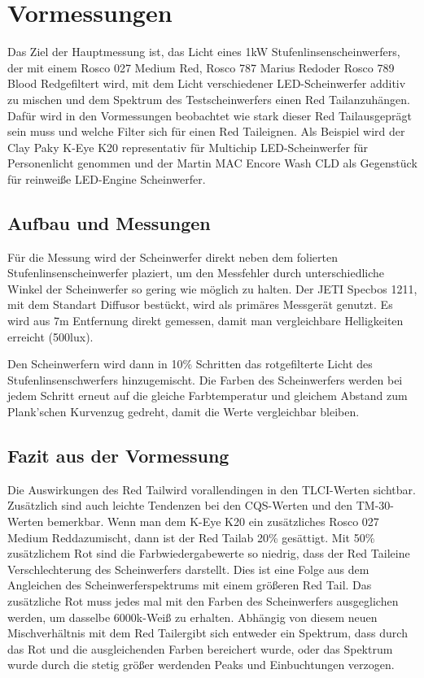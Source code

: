 \chapter{Vormessungen}

Das Ziel der Hauptmessung ist, das Licht eines 1kW Stufenlinsenscheinwerfers, der mit einem Rosco 027 \glqq Medium Red\grqq , Rosco 787 \glqq Marius Red\grqq oder Rosco 789 \glqq Blood Red\grqq gefiltert wird, mit dem Licht verschiedener LED-Scheinwerfer additiv zu mischen und dem Spektrum des Testscheinwerfers einen \glqq Red Tail\grqq anzuhängen. 
Dafür wird in den Vormessungen beobachtet wie stark dieser \glqq Red Tail\grqq ausgeprägt sein muss und welche Filter sich für einen \glqq Red Tail\grqq eignen.   
Als Beispiel wird der Clay Paky K-Eye K20 representativ für Multichip LED-Scheinwerfer für Personenlicht genommen und der Martin MAC Encore Wash CLD als Gegenstück für reinweiße LED-Engine Scheinwerfer. 

\section{Aufbau und Messungen}
\label{sec_vmaum}

Für die Messung wird der Scheinwerfer direkt neben dem folierten Stufenlinsenscheinwerfer plaziert, um den Messfehler durch unterschiedliche Winkel der Scheinwerfer so gering wie möglich zu halten. Der JETI Specbos 1211, mit dem Standart Diffusor bestückt, wird als primäres Messgerät genutzt. Es wird aus 7m Entfernung direkt gemessen, damit man vergleichbare Helligkeiten erreicht (500lux). 

Den Scheinwerfern wird dann in 10\% Schritten das rotgefilterte Licht des Stufenlinsenschwerfers hinzugemischt. Die Farben des Scheinwerfers werden bei jedem Schritt erneut auf die gleiche Farbtemperatur und gleichem Abstand zum Plank'schen Kurvenzug gedreht, damit die Werte vergleichbar bleiben.


\section{Fazit aus der Vormessung}
\label{sec_vmfazit}
Die Auswirkungen des \glqq Red Tail\grqq wird vorallendingen in den TLCI-Werten sichtbar. Zusätzlich sind auch leichte Tendenzen bei den CQS-Werten und den TM-30-Werten bemerkbar.
Wenn man dem K-Eye K20 ein zusätzliches Rosco 027 \glqq Medium Red\grqq dazumischt, dann ist der \glqq Red Tail\grqq ab 20\% gesättigt. Mit 50\% zusätzlichem Rot sind die Farbwiedergabewerte so niedrig, dass der \glqq Red Tail\grqq eine Verschlechterung des Scheinwerfers darstellt. Dies ist eine Folge aus dem Angleichen des Scheinwerferspektrums mit einem größeren \glqq Red Tail\grqq.
Das zusätzliche Rot muss jedes mal mit den Farben des Scheinwerfers ausgeglichen werden, um dasselbe 6000k-Weiß zu erhalten. Abhängig von diesem neuen Mischverhältnis mit dem \glqq Red Tail\grqq ergibt sich entweder ein Spektrum, dass durch das Rot und die ausgleichenden Farben bereichert wurde, oder das Spektrum wurde durch die stetig größer werdenden Peaks und Einbuchtungen verzogen.

